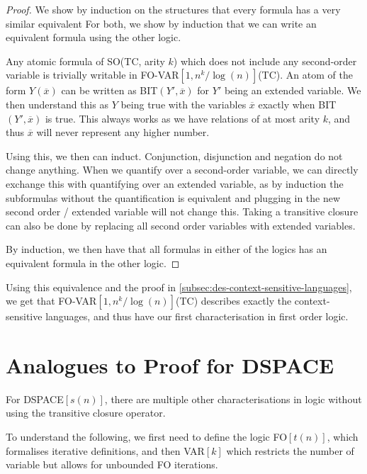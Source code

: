 \begin{proof}
    We show by induction on the structures that every formula has a very similar equivalent 
    For both, we show by induction that we can write an equivalent formula using the other logic.

    Any atomic formula of SO(TC, arity $k$) which does not include any second-order variable is trivially writable in FO-VAR$[1, n^k/\log(n)]$(TC).
    An atom of the form $Y(\overline{x})$ can be written as BIT$(Y', \overline{x})$ for $Y'$ being an extended variable.
    We then understand this as $Y$ being true with the variables $\overline{x}$ exactly when BIT$(Y', \overline{x})$ is true.
    This always works as we have relations of at most arity $k$, and thus $\overline{x}$ will never represent any higher number.

    Using this, we then can induct.
    Conjunction, disjunction and negation do not change anything.
    When we quantify over a second-order variable, we can directly exchange this with quantifying over an extended variable, as by induction the subformulas without the quantification is equivalent and plugging in the new second order / extended variable will not change this.
    Taking a transitive closure can also be done by replacing all second order variables with extended variables.

    By induction, we then have that all formulas in either of the logics has an equivalent formula in the other logic.
\end{proof}

Using this equivalence and the proof in \cref{subsec:des-context-sensitive-languages}, we get that FO-VAR$[1, n^k/\log(n)]$(TC) describes exactly the context-sensitive languages, and thus have our first characterisation in first order logic.

\section{Analogues to Proof for DSPACE}\label{sec:analogues-to-proof-for-dspace}

For DSPACE$[s(n)]$, there are multiple other characterisations in logic without using the transitive closure operator.

To understand the following, we first need to define the logic FO$[t(n)]$, which formalises iterative definitions, and then VAR$[k]$ which restricts the number of variable but allows for unbounded FO iterations.

